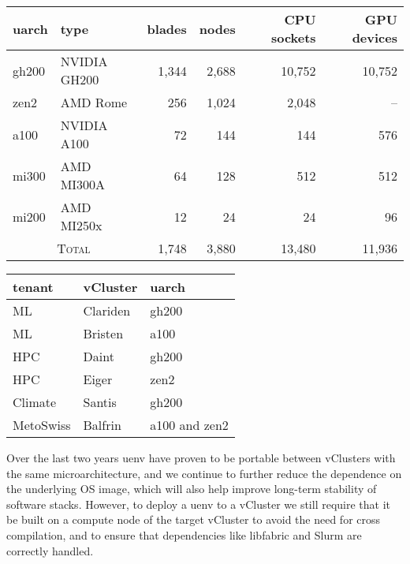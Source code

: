 \begin{table*}[!htb]
    \begin{minipage}{0.6\textwidth}
        \centering
        \begin{tabular}{llrrrr}
        \toprule
        uarch   & type         & blades & nodes & CPU sockets & GPU devices \\
        \midrule
        gh200   & NVIDIA GH200 & 1,344   & 2,688  & 10,752      & 10,752      \\
        zen2    & AMD Rome     & 256     & 1,024  & 2,048       & --          \\
        a100    & NVIDIA A100  & 72      & 144    & 144         & 576         \\
        mi300   & AMD MI300A   & 64      & 128    & 512         & 512         \\
        mi200   & AMD MI250x   & 12      & 24     & 24          & 96          \\
        \midrule
        \multicolumn{2}{c}{\textsc{Total}}      & 1,748   & 3,880  & 13,480  & 11,936 \\
        \bottomrule
        \end{tabular}
    \end{minipage}%
    \begin{minipage}{0.4\textwidth}
        \centering
        \begin{tabular}{lll}
        \toprule
        tenant   & vCluster & uarch         \\
        \midrule
            ML      & Clariden & gh200 \\
            ML      & Bristen  & a100 \\
            HPC     & Daint    & gh200 \\
            HPC     & Eiger    & zen2 \\
            Climate & Santis   & gh200  \\
            MetoSwiss & Balfrin   & a100 and zen2  \\
        \bottomrule
        \end{tabular}
    \end{minipage}
    \caption{Alps node types and their specifications (left), and examples of vClusters provided to tenants (right).}
\label{tab:alps-nodes}
\end{table*}

Over the last two years uenv have proven to be portable between vClusters with the same microarchitecture, and we continue to further reduce the dependence on the underlying OS image, which will also help improve long-term stability of software stacks.
However, to deploy a uenv to a vCluster we still require that it be built on a compute node of the target vCluster to avoid the need for cross compilation, and to ensure that dependencies like libfabric and Slurm are correctly handled.

